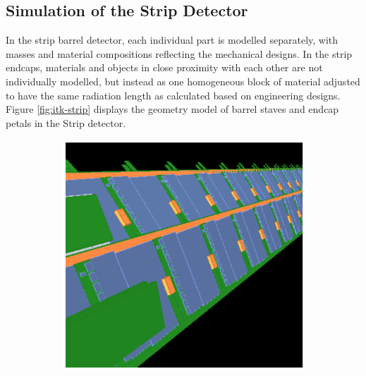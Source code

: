 \subsection{Simulation of the Strip Detector}

In the strip barrel detector, each individual part is modelled separately, with masses and material compositions reflecting the mechanical designs. In the strip endcaps, materials and objects in close proximity with each other are not individually modelled, but instead as one homogeneous block of material adjusted to have the same radiation length as calculated based on engineering designs. Figure \ref{fig:itk-strip} displays the \GEANT  geometry model of barrel staves and endcap petals in the Strip detector. 

\begin{figure}[h!]
    \begin{subfigure}[b]{0.49\textwidth}
        \centering
        \includegraphics[width=\textwidth]{figures/itk-barrel-staves.png}
        \caption{}
        \label{subfig:itk-barrel-staves}
    \end{subfigure}
    \begin{subfigure}[b]{0.49\textwidth}
        \centering

\end{subfigure}
\end{figure}
